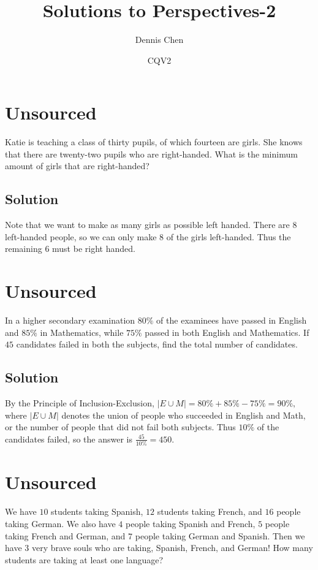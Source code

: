 \documentclass[mast]{lucky}
\title{Solutions to Perspectives-2}
\author{Dennis Chen}
\date{CQV2}
\begin{document}
\maketitle

\toc


\pagebreak\section{Unsourced}

Katie is teaching a class of thirty pupils, of which fourteen are girls. She knows that there are twenty-two pupils who are right-handed. What is the minimum amount of girls that are right-handed?

\subsection{Solution}
Note that we want to make as many girls as possible left handed. There are $8$ left-handed people, so we can only make $8$ of the girls left-handed. Thus the remaining $6$ must be right handed.

\pagebreak\section{Unsourced}
In a higher secondary examination $80\%$ of the examinees have passed in English and $85\%$ in Mathematics, while $75\%$ passed in both English and Mathematics. If $45$ candidates failed in both the subjects, find the total number of candidates.

\subsection{Solution}
By the Principle of Inclusion-Exclusion, $|E\cup M|=80\%+85\%-75\%=90\%,$ where $|E\cup M|$ denotes the union of people who succeeded in English and Math, or the number of people that did not fail both subjects. Thus $10\%$ of the candidates failed, so the answer is $\frac{45}{10\%}=450.$

\pagebreak\section{Unsourced}
We have $10$ students taking Spanish, $12$ students taking French, and $16$ people taking German. We also have $4$ people taking Spanish and French, $5$ people taking French and German, and $7$ people taking German and Spanish. Then we have $3$ very brave souls who are taking, Spanish, French, and German! How many students are taking at least one language?
\end{document}
